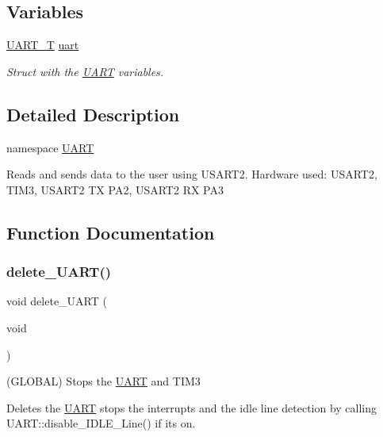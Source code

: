 \subsection*{Variables}
\begin{DoxyCompactItemize}
\item 
\mbox{\hyperlink{struct_u_a_r_t_1_1_u_a_r_t___t}{U\+A\+R\+T\+\_\+T}} \mbox{\hyperlink{namespace_u_a_r_t_ad3d568c339fc1df943e142e2e931299c}{uart}}
\begin{DoxyCompactList}\small\item\em Struct with the \mbox{\hyperlink{namespace_u_a_r_t}{U\+A\+RT}} variables. \end{DoxyCompactList}\end{DoxyCompactItemize}


\subsection{Detailed Description}
namespace \mbox{\hyperlink{namespace_u_a_r_t}{U\+A\+RT}} 

Reads and sends data to the user using U\+S\+A\+R\+T2. Hardware used\+: U\+S\+A\+R\+T2, T\+I\+M3, U\+S\+A\+R\+T2 TX P\+A2, U\+S\+A\+R\+T2 RX P\+A3 

\subsection{Function Documentation}
\mbox{\label{namespace_u_a_r_t_ab7d8037afb7dff98f21b6a07b3fc2158}} 
\subsubsection{\texorpdfstring{delete\+\_\+\+U\+A\+R\+T()}{delete\_UART()}}
{\footnotesize\ttfamily void delete\+\_\+\+U\+A\+RT (\begin{DoxyParamCaption}\item[{void}]{ }\end{DoxyParamCaption})}



(G\+L\+O\+B\+AL) Stops the \mbox{\hyperlink{namespace_u_a_r_t}{U\+A\+RT}} and T\+I\+M3 

Deletes the \mbox{\hyperlink{namespace_u_a_r_t}{U\+A\+RT}} stops the interrupts and the idle line detection by calling U\+A\+R\+T\+::disable\+\_\+\+I\+D\+L\+E\+\_\+\+Line() if its on.


